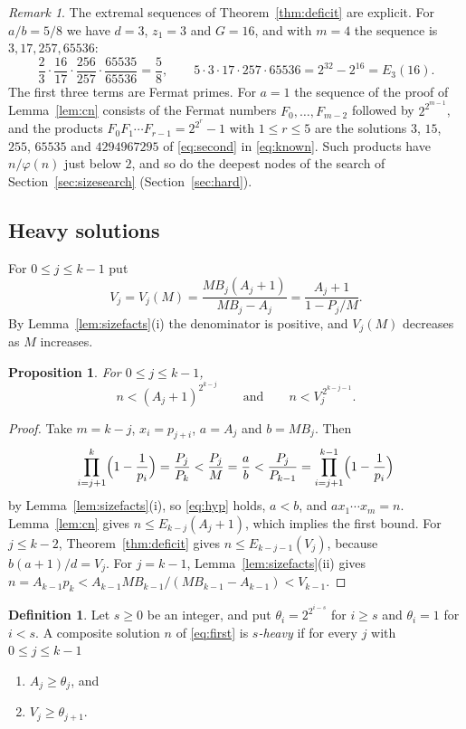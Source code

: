 \documentclass[11pt,reqno]{amsart}
\numberwithin{equation}{section}
\theoremstyle{plain}
\newtheorem{proposition}[theorem]{Proposition}
\theoremstyle{definition}
\newtheorem{definition}[theorem]{Definition}
\theoremstyle{remark}
\newtheorem{remark}[theorem]{Remark}
\begin{document}
\begin{remark}\label{rem:fermat}
The extremal sequences of Theorem~\ref{thm:deficit} are explicit. For
$a/b=5/8$ we have $d=3$, $z_1=3$ and $G=16$, and with $m=4$ the
sequence is $3,17,257,65536$:
\[
  \frac23\cdot\frac{16}{17}\cdot\frac{256}{257}\cdot\frac{65535}{65536}
  =\frac58,\qquad
  5\cdot3\cdot17\cdot257\cdot65536=2^{32}-2^{16}=E_3(16).
\]
The first three terms are Fermat primes. For $a=1$ the sequence of
the proof of Lemma~\ref{lem:cn} consists of the Fermat numbers
$F_0,\dots,F_{m-2}$ followed by $2^{2^{m-1}}$, and the products
$F_0F_1\cdots F_{r-1}=2^{2^r}-1$ with $1\le r\le5$ are the solutions
$3$, $15$, $255$, $65535$ and $4294967295$ of \eqref{eq:second} in
\eqref{eq:known}. Such products have $n/\varphi(n)$ just below $2$,
and so do the deepest nodes of the search of
Section~\ref{sec:sizesearch} (Section~\ref{sec:hard}).
\end{remark}

\subsection{Heavy solutions}\label{sec:heavy}
For $0\le j\le k-1$ put
\begin{equation}\label{eq:V}
  V_j=V_j(M)=\frac{MB_j(A_j+1)}{MB_j-A_j}=\frac{A_j+1}{1-P_j/M}.
\end{equation}
By Lemma~\ref{lem:sizefacts}(i) the denominator is positive, and
$V_j(M)$ decreases as $M$ increases.

\begin{proposition}\label{prop:sizebounds}
For $0\le j\le k-1$,
\[
  n<(A_j+1)^{2^{k-j}}\qquad\text{and}\qquad n<V_j^{\,2^{k-j-1}} .
\]
\end{proposition}

\begin{proof}
Take $m=k-j$, $x_i=p_{j+i}$, $a=A_j$ and $b=MB_j$. Then
\[
  \prod_{i=j+1}^{k}\Bigl(1-\frac1{p_i}\Bigr)=\frac{P_j}{P_k}
  <\frac{P_j}{M}=\frac ab<\frac{P_j}{P_{k-1}}
  =\prod_{i=j+1}^{k-1}\Bigl(1-\frac1{p_i}\Bigr)
\]
by Lemma~\ref{lem:sizefacts}(i), so \eqref{eq:hyp} holds, $a<b$, and
$ax_1\cdots x_m=n$. Lemma~\ref{lem:cn} gives $n\le E_{k-j}(A_j+1)$,
which implies the first bound. For $j\le k-2$,
Theorem~\ref{thm:deficit} gives $n\le E_{k-j-1}(V_j)$, because
$b(a+1)/d=V_j$. For $j=k-1$, Lemma~\ref{lem:sizefacts}(ii) gives
$n=A_{k-1}p_k<A_{k-1}MB_{k-1}/(MB_{k-1}-A_{k-1})<V_{k-1}$.
\end{proof}

\begin{definition}\label{def:heavy}
Let $s\ge0$ be an integer, and put $\theta_i=2^{2^{i-s}}$ for $i\ge s$
and $\theta_i=1$ for $i<s$. A composite solution $n$ of
\eqref{eq:first} is \emph{$s$-heavy} if for every $j$ with
$0\le j\le k-1$
\begin{enumerate}[label=\textup{(H\arabic*)}]
\item $A_j\ge\theta_j$, and
\item $V_j\ge\theta_{j+1}$.
\end{enumerate}
\end{definition}
\end{document}
